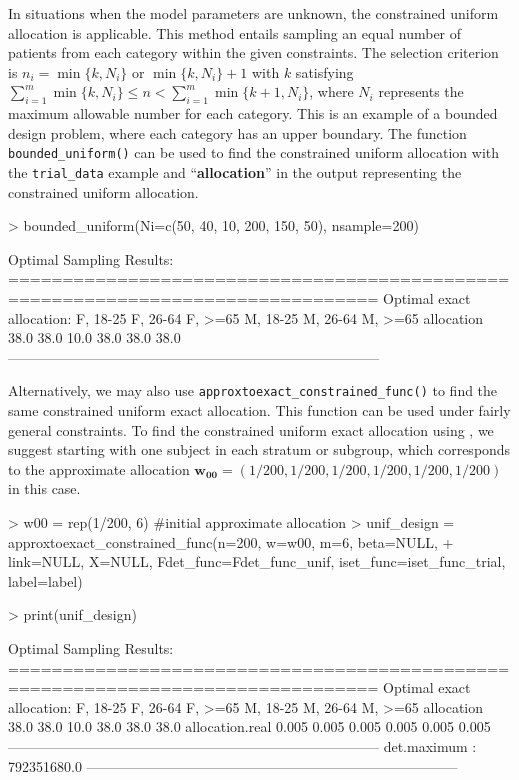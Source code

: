 
In situations when the model parameters are unknown, the constrained uniform allocation is applicable. This method entails sampling an equal number of patients from each category within the given constraints. The selection criterion is $n_i = \min\{k, N_i\}$ or $\min\{k, N_i\}+1$ with $k$ satisfying $\sum_{i=1}^m \min\{k, N_i\} \leq n < \sum_{i=1}^m \min\{k+1, N_i\}$, where $N_i$ represents the maximum allowable number for each category. This is an example of a bounded design problem, where each category has an upper boundary. The function \texttt{bounded\_uniform()} can be used to find the constrained uniform allocation with the \texttt{trial\_data} example and ``\textbf{allocation}'' in the output representing the constrained uniform allocation.

\begin{example}
> bounded_uniform(Ni=c(50, 40, 10, 200, 150, 50), nsample=200)

Optimal Sampling Results:
================================================================================
Optimal exact allocation:
           F, 18-25 F, 26-64 F, >=65 M, 18-25 M, 26-64 M, >=65
allocation 38.0     38.0     10.0    38.0     38.0     38.0
--------------------------------------------------------------------------------
\end{example}

Alternatively, we may also use \texttt{approxtoexact\_constrained\_func()} to find the same constrained uniform exact allocation. This function can be used under fairly general constraints. To find the constrained uniform exact allocation using \texttt{}, we suggest starting with one subject in each stratum or subgroup, which corresponds to the approximate allocation $\mathbf{w_{00}}=(1/200,1/200,1/200,1/200,1/200,1/200)$ in this case.

\begin{example}
> w00 = rep(1/200, 6) #initial approximate allocation
> unif_design = approxtoexact_constrained_func(n=200, w=w00, m=6, beta=NULL,
+ link=NULL, X=NULL, Fdet_func=Fdet_func_unif, iset_func=iset_func_trial, label=label)

> print(unif_design)

Optimal Sampling Results:
================================================================================
Optimal exact allocation:
                F, 18-25 F, 26-64 F, >=65 M, 18-25 M, 26-64 M, >=65
allocation      38.0     38.0     10.0    38.0     38.0     38.0
allocation.real 0.005    0.005    0.005   0.005    0.005    0.005
--------------------------------------------------------------------------------
det.maximum :
792351680.0
--------------------------------------------------------------------------------

\end{example}

